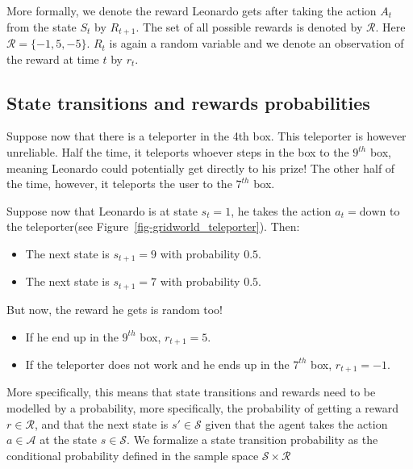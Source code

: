 \documentclass[
  letterpaper,
]{report}
\providecommand{\tightlist}{%
  \setlength{\itemsep}{0pt}\setlength{\parskip}{0pt}}\usepackage{longtable,booktabs,array}
\theoremstyle{plain}
\theoremstyle{definition}
\theoremstyle{definition}
\theoremstyle{remark}
\begin{document}
More formally, we denote the reward Leonardo gets after taking the
action \(A_t\) from the state \(S_t\) by \(R_{t+1}\). The set of all
possible rewards is denoted by \(\mathcal{R}\). Here
\(\mathcal{R} = \{-1,5,-5\}\). \(R_t\) is again a random variable and we
denote an observation of the reward at time \(t\) by \(r_t\).

\hypertarget{state-transitions-and-rewards-probabilities}{%
\subsection{State transitions and rewards
probabilities}\label{state-transitions-and-rewards-probabilities}}

Suppose now that there is a teleporter in the 4th box. This teleporter
is however unreliable. Half the time, it teleports whoever steps in the
box to the \(9^{th}\) box, meaning Leonardo could potentially get
directly to his prize! The other half of the time, however, it teleports
the user to the \(7^{th}\) box.

Suppose now that Leonardo is at state \(s_t=1\), he takes the action
\(a_t = \text{down}\) to the teleporter(see
Figure~\ref{fig-gridworld_teleporter}). Then:

\begin{itemize}
\tightlist
\item
  The next state is \(s_{t+1} = 9\) with probability \(0.5\).
\item
  The next state is \(s_{t+1} = 7\) with probability \(0.5\).
\end{itemize}

But now, the reward he gets is random too!

\begin{itemize}
\tightlist
\item
  If he end up in the \(9^{th}\) box, \(r_{t+1} = 5\).
\item
  If the teleporter does not work and he ends up in the \(7^{th}\) box,
  \(r_{t+1} = -1\).
\end{itemize}

More specifically, this means that state transitions and rewards need to
be modelled by a probability, more specifically, the probability of
getting a reward \(r\in\mathcal{R}\), and that the next state is
\(s'\in\mathcal{S}\) given that the agent takes the action
\(a\in\mathcal{A}\) at the state \(s\in\mathcal{S}\). We formalize a
state transition probability as the conditional probability defined in
the sample space \(\mathcal{S}\times \mathcal{R}\)
\end{document}
